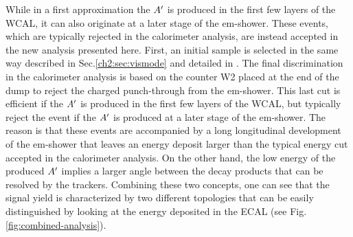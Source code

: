 While in a first approximation the $A'$ is produced in the first few layers of the WCAL, it can also originate at a later stage of the em-shower. These events, which are typically rejected in the calorimeter analysis, are instead accepted in the new analysis presented here. First, an initial sample is selected in the same way described in Sec.\ref{ch2:sec:vismode} and detailed in \cite{Banerjee:2019hmi}. The final discrimination in the calorimeter analysis is based on the counter W2 placed at the end of the dump to reject the charged punch-through from the em-shower. This last cut is efficient if the $A'$ is produced in the first few layers of the WCAL, but typically reject the event if the $A'$ is produced at a later stage of the em-shower. The reason is that these events are accompanied by a long longitudinal development of the em-shower that leaves an energy deposit larger than the typical energy cut accepted in the calorimeter analysis. On the other hand, the low energy of the produced $A'$ implies a larger angle between the decay products that can be resolved by the trackers. Combining these two concepts, one can see that the signal yield is characterized by two different topologies that can be easily distinguished by looking at the energy deposited in the ECAL (see Fig.\ref{fig:combined-analysis}).

